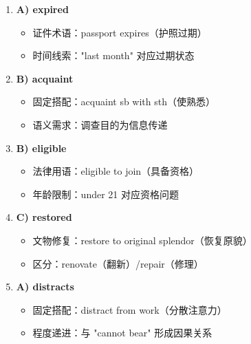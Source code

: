 \documentclass{article}
\begin{document}
\begin{enumerate}[label=\textbf{\arabic*.}]
    \item \textbf{A) expired} 
    \begin{itemize}
        \item 证件术语：passport expires（护照过期）
        \item 时间线索："last month" 对应过期状态
    \end{itemize}
    
    \item \textbf{B) acquaint} 
    \begin{itemize}
        \item 固定搭配：acquaint sb with sth（使熟悉）
        \item 语义需求：调查目的为信息传递
    \end{itemize}
    
    \item \textbf{B) eligible} 
    \begin{itemize}
        \item 法律用语：eligible to join（具备资格）
        \item 年龄限制：under 21 对应资格问题
    \end{itemize}
    
    \item \textbf{C) restored} 
    \begin{itemize}
        \item 文物修复：restore to original splendor（恢复原貌）
        \item 区分：renovate（翻新）/repair（修理）
    \end{itemize}
    
    \item \textbf{A) distracts} 
    \begin{itemize}
        \item 固定搭配：distract from work（分散注意力）
        \item 程度递进：与 "cannot bear" 形成因果关系
    \end{itemize}
\end{enumerate}
\end{document}
